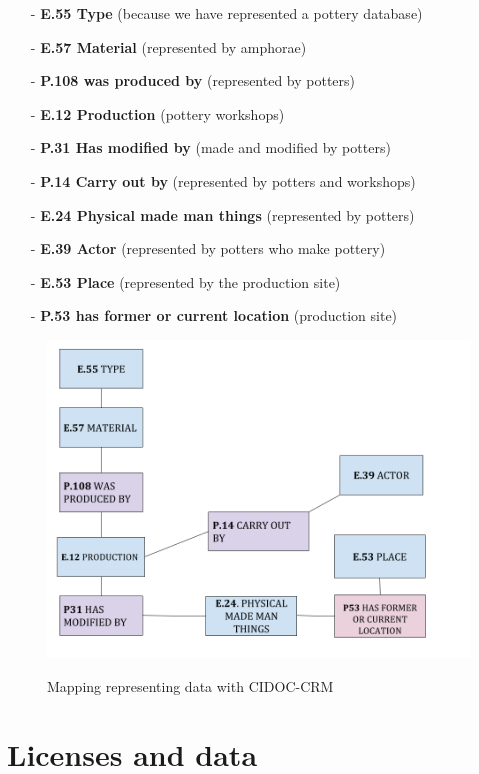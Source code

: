\documentclass[10pt,a4paper]{article}
\begin{document}
\begin{itemize}
\item[-] \textbf{E.55 Type} (because we have represented a pottery database)
\item[-] \textbf{E.57 Material} (represented by amphorae)
\item[-] \textbf{P.108 was produced by} (represented by potters)
\item[-] \textbf{E.12 Production} (pottery workshops)
\item[-] \textbf{P.31 Has modified by} (made and modified by potters)
\item[-] \textbf{P.14 Carry out by} (represented by potters and workshops)
\item[-] \textbf{E.24 Physical made man things} (represented by potters)
\item[-] \textbf{E.39 Actor} (represented by potters who make pottery)
\item[-] \textbf{E.53 Place} (represented by the production site)
\item[-] \textbf{P.53 has former or current location} (production site)
\end{itemize}


\begin{figure}[hdp]
\centering
\includegraphics[scale=0.50]{sparex.png}
\label{sparex}
\caption{Mapping representing data with CIDOC-CRM}
\end{figure}


\section{Licenses and data}
\end{document}
